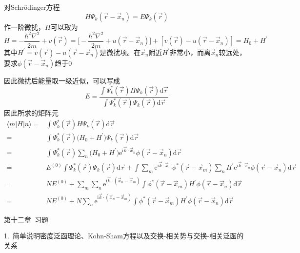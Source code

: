 对\textrm{Schr\"odinger}方程
\begin{displaymath}
	H\Psi_k(\vec r-\vec x_n)=E\Psi_k(\vec r)
\end{displaymath}
作一阶微扰，$H$可以取为
\begin{displaymath}
	H=-\dfrac{\hbar^2\nabla^2}{2m}+v(\vec r)=\bigg[-\dfrac{\hbar^2\nabla^2}{2m}+u(\vec r-\vec x_n)\bigg]+[v(\vec r)-u(\vec r-\vec x_n)]=H_0+H^{\prime}
\end{displaymath}
其中$H^{\prime}=v(\vec r)-u(\vec r-\vec x_n)$是微扰项。在$\vec x_n$附近$H^{\prime}$非常小，而离$\vec x_n$较远处，要求$\phi(\vec r-\vec x_n)$趋于0

因此微扰后能量取一级近似，可以写成
\begin{displaymath}
	E=\dfrac{\int\Psi_k^{\ast}(\vec r)H\Psi_k(\vec r)\mathrm{d}\vec r}{\int\Psi_k^{\ast}(\vec r)\Psi_k(\vec r)\mathrm{d}\vec r}
\end{displaymath}
因此所求的矩阵元
\begin{displaymath}
	\begin{aligned}
		\langle m|H|n\rangle=&\int\Psi_k^{\ast}(\vec r)H\Psi_k(\vec r)\mathrm{d}\vec r\\
		=&\int\Psi_k^{\ast}(\vec r)\big(H_0+H^{\prime}\big)\Psi_k(\vec r)\mathrm{d}\vec r\\
		=&\int\Psi_k^{\ast}(\vec r)\sum_n\big(H_0+H^{\prime}\big)\mathrm{e}^{\mathrm{i}\vec k\cdot\vec x_n}\phi(\vec r-\vec x_n)\mathrm{d}\vec r\\
		=&E^{(0)}\int\Psi_k^{\ast}(\vec r)\Psi_k(\vec r)\mathrm{d}\vec r+\int\sum_m\mathrm{e}^{\mathrm{i}\vec k\cdot\vec x_m}\phi^{\ast}(\vec r-\vec x_m)\sum_nH^{\prime}\mathrm{e}^{\mathrm{i}\vec k\cdot\vec x_n}\phi(\vec r-\vec x_n)\mathrm{d}\vec r\\
		=&NE^{(0)}+\sum_m\sum_n\mathrm{e}^{\mathrm{i}\vec k\cdot(\vec x_n-\vec x_m)}\int\phi^{\ast}(\vec r-\vec x_m)H^{\prime}\phi(\vec r-\vec x_n)\mathrm{d}\vec r\\
		=&NE^{(0)}+N\sum_n\mathrm{e}^{\mathrm{i}\vec k\cdot(\vec x_n-\vec x_m)}\int\phi^{\ast}(\vec r-\vec x_m)H^{\prime}\phi(\vec r-\vec x_n)\mathrm{d}\vec r
	\end{aligned}
\end{displaymath}



{\heiti 第十二章~习题}

1.~简单说明密度泛函理论、\textrm{Kohn-Sham}方程以及交换-相关势与交换-相关泛函的关系

